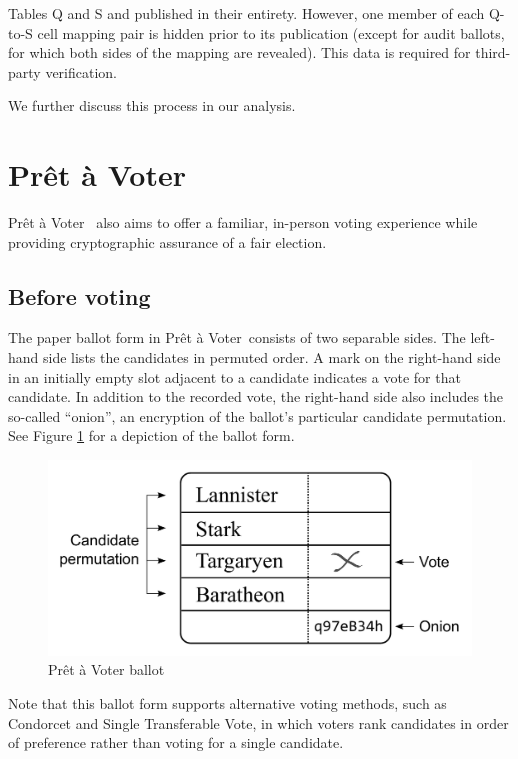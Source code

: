 \documentclass[10pt,twocolumn]{article}
\newcommand{\preta}{Pr\^{e}t \`{a}}
\newcommand{\pv}{\preta{} Voter}
\begin{document}
Tables Q and S and published in their entirety. However, one member of each Q-to-S cell mapping pair
is hidden prior to its publication (except for audit ballots, for which both sides of the mapping
are revealed). This data is required for third-party verification.

We further discuss this process in our analysis.

\section{\pv{}}

\pv\ \cite{preta} also aims to offer a familiar, in-person voting experience while providing cryptographic assurance of
a fair election.

\subsection{Before voting}

The paper ballot form in \pv\ consists of two separable sides.
The left-hand side lists the candidates in permuted order.
A mark on the right-hand side in an initially empty slot adjacent to a candidate indicates a vote for that candidate.
In addition to the recorded vote, the right-hand side also includes the so-called ``onion'', an encryption of the ballot's particular candidate permutation.
See Figure \ref{fig:preta} for a depiction of the ballot form.

\begin{figure}
	\center
	\includegraphics[width=\columnwidth]{images/include/preta.pdf}
	\caption{\pv{} ballot}
	\label{fig:preta}
\end{figure}

Note that this ballot form supports alternative voting methods, such as Condorcet and Single Transferable Vote, in which voters rank candidates in order of preference rather than voting for a single candidate.
\end{document}
